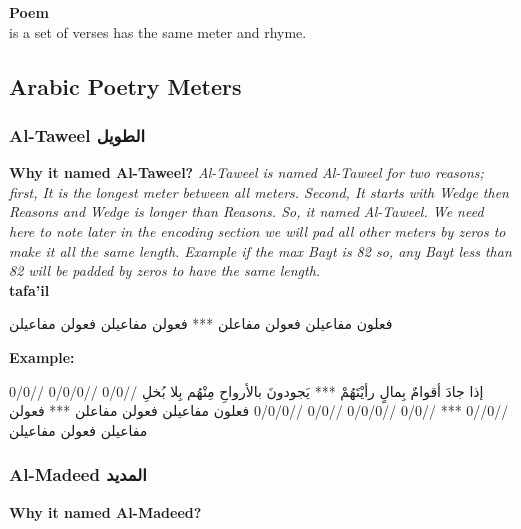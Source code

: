 \begin{definition}\label{def:poem}
  \textbf{Poem} \hfill \\
  is a set of verses has the same meter and rhyme.

\end{definition}


\newpage

\subsection{Arabic Poetry Meters}

\subsubsection{Al-Taweel \textarabic{الطويل}}
\textbf{Why it named Al-Taweel?}
\textit{Al-Taweel is named Al-Taweel for two reasons; first, It is the longest meter between all meters. Second, It starts with Wedge then Reasons and Wedge is longer than Reasons. So, it named Al-Taweel. We need here to note later in the encoding section we will pad all other meters by zeros to make it all the same length. Example if the max Bayt is 82 so, any Bayt less than 82 will be padded by zeros to have the same length.\cite{Alkafi1994}
  }\\

\textbf{tafa'il}

\begin{Arabic}
	\begin{traditionalpoem*}
          فعلون مفاعيلن فعولن مفاعلن *** فعولن مفاعيلن فعولن مفاعيلن


	\end{traditionalpoem*}
      \end{Arabic}

\textbf{Example:}
\begin{Arabic}
	\begin{traditionalpoem*}
          إذا جادَ أقوامٌ بِمالٍ رأيْتَهُمْ  *** يَجودونَ بالأرواحِ مِنْهُم بِلا بُخلِ
          //0/0 //0/0/0 //0/0 //0//0 *** //0/0 //0/0/0 //0/0 //0/0/0
          فعلون مفاعيلن فعولن مفاعلن *** فعولن مفاعيلن فعولن مفاعيلن

	\end{traditionalpoem*}
      \end{Arabic}


\subsubsection{Al-Madeed \textarabic{المديد}}
\textbf{Why it named Al-Madeed?}

